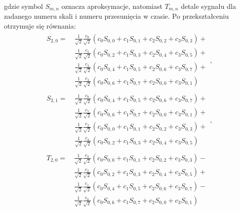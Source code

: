 gdzie symbol $S_{m,n}$ oznacza aproksymacje, natomiast $T_{m,n}$ detale sygnału dla zadanego numeru skali i numeru przesunięcia w czasie. Po przekształceniu otrzymuje się równania:
\begin{gather}
\begin{split}
S_{2,0} =~
	& \frac{1}{\sqrt{2}} \frac{c_{0}}{\sqrt{2}} \left( c_{0} S_{0,0} + c_{1} S_{0,1} + c_{2} S_{0,2} + c_{3} S_{0,3} \right) + \\
	& \frac{1}{\sqrt{2}} \frac{c_{1}}{\sqrt{2}} \left( c_{0} S_{0,2} + c_{1} S_{0,3} + c_{2} S_{0,4} + c_{3} S_{0,5} \right) + \\
	& \frac{1}{\sqrt{2}} \frac{c_{2}}{\sqrt{2}} \left( c_{0} S_{0,4} + c_{1} S_{0,5} + c_{2} S_{0,6} + c_{3} S_{0,7} \right) + \\
	& \frac{1}{\sqrt{2}} \frac{c_{3}}{\sqrt{2}} \left( c_{0} S_{0,6} + c_{1} S_{0,7} + c_{2} S_{0,0} + c_{3} S_{0,1} \right)
\end{split}
\label{eq:db2_outvect_s_2_0_rek}, \\
\begin{split}
S_{2,1} =~
	& \frac{1}{\sqrt{2}} \frac{c_{0}}{\sqrt{2}} \left( c_{0} S_{0,4} + c_{1} S_{0,5} + c_{2} S_{0,6} + c_{3} S_{0,7} \right) + \\
	& \frac{1}{\sqrt{2}} \frac{c_{1}}{\sqrt{2}} \left( c_{0} S_{0,6} + c_{1} S_{0,7} + c_{2} S_{0,0} + c_{3} S_{0,1} \right) + \\
	& \frac{1}{\sqrt{2}} \frac{c_{2}}{\sqrt{2}} \left( c_{0} S_{0,0} + c_{1} S_{0,1} + c_{2} S_{0,2} + c_{3} S_{0,3} \right) + \\
	& \frac{1}{\sqrt{2}} \frac{c_{3}}{\sqrt{2}} \left( c_{0} S_{0,2} + c_{1} S_{0,3} + c_{2} S_{0,4} + c_{3} S_{0,5} \right)
\end{split}
\label{eq:db2_outvect_s_2_1_rek}, \\
\begin{split}
T_{2,0} =~
	& \frac{1}{\sqrt{2}} \frac{c_{3}}{\sqrt{2}} \left( c_{0} S_{0,0} + c_{1} S_{0,1} + c_{2} S_{0,2} + c_{3} S_{0,3} \right) - \\
	& \frac{1}{\sqrt{2}} \frac{c_{2}}{\sqrt{2}} \left( c_{0} S_{0,2} + c_{1} S_{0,3} + c_{2} S_{0,4} + c_{3} S_{0,5} \right) + \\
	& \frac{1}{\sqrt{2}} \frac{c_{1}}{\sqrt{2}} \left( c_{0} S_{0,4} + c_{1} S_{0,5} + c_{2} S_{0,6} + c_{3} S_{0,7} \right) - \\
	& \frac{1}{\sqrt{2}} \frac{c_{0}}{\sqrt{2}} \left( c_{0} S_{0,6} + c_{1} S_{0,7} + c_{2} S_{0,0} + c_{3} S_{0,1} \right)
\end{split}

\end{gather}
